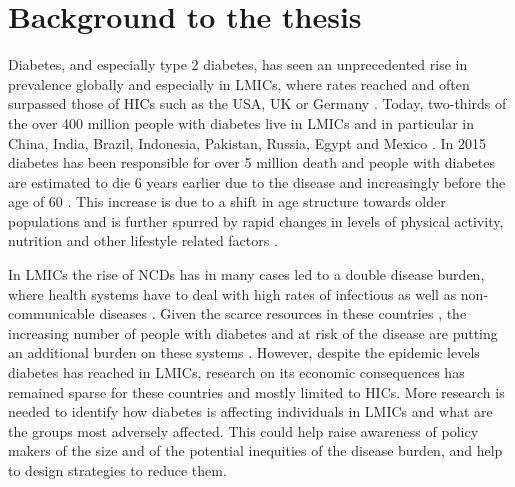 
\section{Background to the thesis}

Diabetes, and especially type 2 diabetes, has seen an unprecedented rise in prevalence globally and especially in \acp{LMIC}, where rates reached and often surpassed those of \acp{HIC} such as the USA, UK or Germany \parencite{Risk2016,Hu2011}. Today, two-thirds of the over 400 million people with diabetes live in \acp{LMIC} \parencite{InternationalDiabetesFederation2013} and in particular in China, India, Brazil, Indonesia, Pakistan, Russia, Egypt and Mexico \parencite{Risk2016}. In 2015 diabetes has been responsible for over 5 million death and people with diabetes are estimated to die 6 years earlier due to the disease and increasingly before the age of 60 \parencite{InternationalDiabetesFederation2015,Seshasai2011}. This increase is due to a shift in age structure towards older populations and is further spurred by rapid changes in levels of physical activity, nutrition and other lifestyle related factors \parencite{Risk2016,Hu2011}.

In \acp{LMIC} the rise of \acp{NCD} has in many cases led to a double disease burden, where health systems have to deal with high rates of infectious as well as non-communicable diseases \parencite{Jamison2013}. Given the scarce resources in these countries \parencite{Mills2014}, the increasing number of people with diabetes and at risk of the disease are putting an additional burden on these systems \parencite{Wareham2016,Chan2016}. However, despite the epidemic levels diabetes has reached in \acp{LMIC}, research on its economic consequences has remained sparse for these countries and mostly limited to \acp{HIC}. More research is needed to identify how diabetes is affecting individuals in \acp{LMIC} and what are the groups most adversely affected. This could help raise awareness of policy makers of the size and of the potential inequities of the disease burden, and help to design strategies to reduce them.

